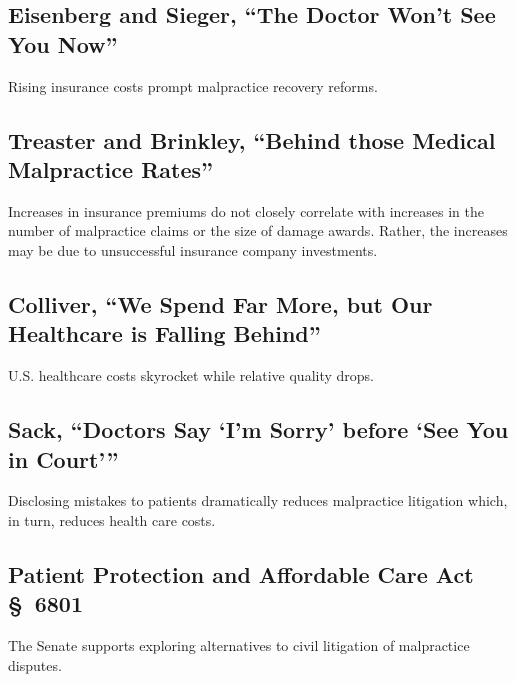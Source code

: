 \subsection{Eisenberg and Sieger, ``The Doctor Won't See You Now''}

Rising insurance costs prompt malpractice recovery reforms.

\subsection{Treaster and Brinkley, ``Behind those Medical Malpractice 
Rates''}

Increases in insurance premiums do not closely correlate with increases in the 
number of malpractice claims or the size of damage awards. Rather, the increases 
may be due to unsuccessful insurance company investments.

\subsection{Colliver, ``We Spend Far More, but Our Healthcare is Falling 
Behind''}

U.S. healthcare costs skyrocket while relative quality drops.

\subsection{Sack, ``Doctors Say `I'm Sorry' before `See You in Court'''}

Disclosing mistakes to patients dramatically reduces malpractice litigation 
which, in turn, reduces health care costs.

\subsection{Patient Protection and Affordable Care Act \S\ 6801}

The Senate supports exploring alternatives to civil litigation of malpractice 
disputes.
